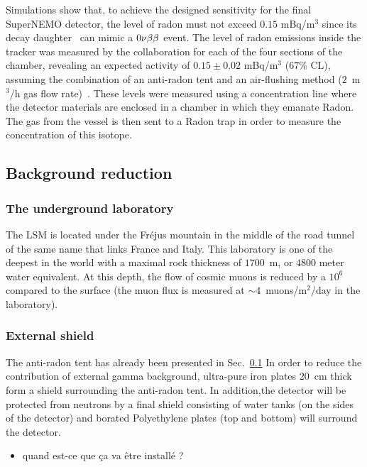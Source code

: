 Simulations show that, to achieve the designed sensitivity for the final SuperNEMO detector, the level of radon must not exceed $0.15$ mBq/m$^{3}$ since its decay daughter \Bi\ can mimic a $0\nu\beta\beta$ event.
The level of radon emissions inside the tracker was measured by the collaboration for each of the four sections of the chamber, revealing an expected activity of $0.15\pm0.02$ mBq/m$^{3}$ ($67$\% CL), assuming the combination of an anti-radon tent and an air-flushing method ($2$~m$^{3}$/h gas flow rate)~\cite{conf:radon2017}.
These levels were measured using a concentration line where the detector materials are enclosed in a chamber in which they emanate Radon.
The gas from the vessel is then sent to a Radon trap in order to measure the concentration of this isotope.


\subsection{Background reduction}

\subsubsection*{The underground laboratory}

The LSM is located under the Fréjus mountain in the middle of the road tunnel of the same name that links France and Italy.
This laboratory is one of the deepest in the world with a maximal rock thickness of $1700$~m, or $4800$ meter water equivalent.
At this depth, the flow of cosmic muons is reduced by a $10^{6}$ compared to the surface (the muon flux is measured at $\sim4$~muons/m$^{2}$/day in the laboratory).

\subsubsection*{External shield}

The anti-radon tent has already been presented in Sec.~\ref{}
In order to reduce the contribution of external gamma background, ultra-pure iron plates $20$~cm thick form a shield surrounding the anti-radon tent.
In addition,the detector will be protected from neutrons by a final shield consisting of water tanks (on the sides of the detector) and borated Polyethylene plates (top and bottom) will surround the detector.

\begin{itemize}
\item quand est-ce que ça va être installé ?
\end{itemize}


